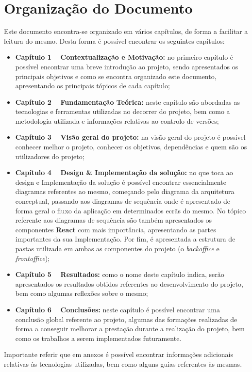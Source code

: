 \section{Organização do Documento}

Este documento encontra-se organizado em vários capítulos, de forma a facilitar a leitura do mesmo. Desta forma é possível encontrar os seguintes capítulos:

\begin{itemize}
	\item \textbf{Capítulo 1 \textemdash~ Contextualização e Motivação:} no primeiro capítulo é possível encontrar uma breve introdução ao projeto, sendo apresentados os principais objetivos e como se encontra organizado este documento, apresentando os principais tópicos de cada capítulo;

	\item \textbf{Capítulo 2 \textemdash~ Fundamentação Teórica:} neste capítulo são abordadas as tecnologias e ferramentas utilizadas no decorrer do projeto, bem como a metodologia utilizada e informações relativas ao controlo de versões;

	\item \textbf{Capítulo 3 \textemdash~ Visão geral do projeto:} na visão geral do projeto é possível conhecer melhor o projeto, conhecer os objetivos, dependências e quem são os utilizadores do projeto;

	\item \textbf{Capítulo 4 \textemdash~ Design \& Implementação da solução:} no que toca ao design e Implementação da solução é possível encontrar essencialmente diagramas referentes ao mesmo, começando pelo diagrama da arquitetura conceptual, passando aos diagramas de sequência onde é apresentado de forma geral o fluxo da aplicação em determinados ecrãs do mesmo. No tópico referente aos diagramas de sequência são também apresentados os componentes \textbf{React} com mais importância, apresentando as partes importantes da sua Implementação. Por fim, é apresentada a estrutura de pastas utilizada em ambas as componentes do projeto (o \textit{backoffice} e \textit{frontoffice});

	\item \textbf{Capítulo 5 \textemdash~ Resultados:} como o nome deste capítulo indica, serão apresentados os resultados obtidos referentes ao desenvolvimento do projeto, bem como algumas reflexões sobre o mesmo;

	\item  \textbf{Capítulo 6 \textemdash~ Conclusões:} neste capítulo é possível encontrar uma conclusão global referente ao projeto, algumas das formações realizadas de forma a conseguir melhorar a prestação durante a realização do projeto, bem como os trabalhos a serem implementados futuramente.
\end{itemize}

Importante referir que em anexos é possível encontrar informações adicionais relativas às tecnologias utilizadas, bem como alguns guias referentes às mesmas.